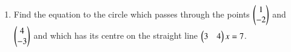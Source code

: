 \renewcommand{\theequation}{\theenumi}
\renewcommand{\thefigure}{\theenumi}
\begin{enumerate}[label=\thesubsection.\arabic*.,ref=\thesubsection.\theenumi]

\item Find the equation to the circle which passes through the points $\begin{pmatrix} 1 \\ -2 \end{pmatrix}$ and $\begin{pmatrix} 4 \\ -3 \end{pmatrix}$ and which has its centre on the straight line $\begin{pmatrix} 3 & 4 \end{pmatrix}x = 7$.
%
\\
\solution

\end{enumerate}
